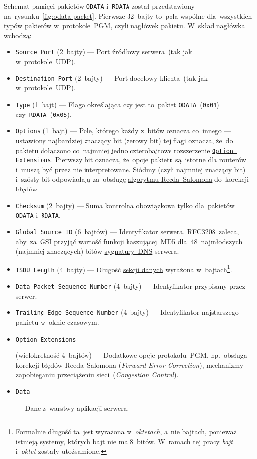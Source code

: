 \documentclass[thesis]{subfiles}
\begin{document}
Schemat pamięci pakietów \texttt{ODATA} i~\texttt{RDATA} został przedstawiony na~rysunku~\ref{fig:odata-packet}. Pierwsze 32~bajty to~pola wspólne dla~wszystkich typów pakietów w~protokole~PGM, czyli nagłówek pakietu. W~skład nagłówka wchodzą:
\begin{itemize}
	\item \texttt{Source~Port} (2~bajty) --- Port źródłowy serwera~(tak jak w~protokole~UDP).
	\item \texttt{Destination~Port} (2~bajty) --- Port docelowy klienta~(tak jak w~protokole~UDP).
	\item \texttt{Type} (1~bajt) --- Flaga określająca czy jest to~pakiet \texttt{ODATA}~(\texttt{0x04}) czy~\texttt{RDATA}~(\texttt{0x05}).
	\item \texttt{Options} (1~bajt) --- Pole, którego każdy z~bitów oznacza co~innego --- ustawiony najbardziej znaczący bit (zerowy bit) tej flagi oznacza, że~do pakietu dołączono co~najmniej jedno czterobajtowe rozszerzenie \hyperlink{itm:optext}{\texttt{Option Extensions}}. Pierwszy bit oznacza, że~\hyperlink{itm:optext}{opcje} pakietu są~istotne dla routerów i~muszą być przez nie interpretowane. Siódmy (czyli najmniej znaczący bit) i~szósty bit odpowiadają za~obsługę \href{https://en.wikipedia.org/wiki/Reed\%E2\%80\%93Solomon\_error\_correction}{algorytmu Reeda--Salomona} do~korekcji błędów.
	\item \texttt{Checksum} (2~bajty) --- Suma kontrolna obowiązkowa tylko dla~pakietów \texttt{ODATA} i~\texttt{RDATA}.
	\item \texttt{Global Source~ID} (6~bajtów) --- Identyfikator serwera. \href{https://tools.ietf.org/html/rfc3208\#page-33}{RFC3208~zaleca}, aby~za~GSI przyjąć wartość funkcji haszującej~\href{https://en.wikipedia.org/wiki/MD5}{MD5} dla~48~najmłodszych (najmniej znaczących) bitów \href{https://tools.ietf.org/html/rfc2535\#section-4}{sygnatury~DNS} serwera.
	\item \texttt{TSDU~Length} (4~bajty) --- Długość \hyperlink{itm:datasec}{sekcji danych} wyrażona w~bajtach\footnote{Formalnie długość ta~jest wyrażona w~\emph{oktetach}, a~nie bajtach, ponieważ istnieją systemy, których bajt nie ma 8~bitów. W~ramach tej pracy \emph{bajt} i~\emph{oktet} zostały utożsamione.}.
	\item \texttt{Data Packet Sequence Number} (4~bajty) --- Identyfikator przypisany przez serwer.
	\item \texttt{Trailing Edge Sequence Number} (4~bajty) --- Identyfikator najstarszego pakietu w~oknie czasowym.
	\item \hypertarget{itm:optext}{\texttt{Option Extensions}} (wielokrotność 4~bajtów) --- Dodatkowe opcje protokołu~PGM, np.~obsługa korekcji błędów Reeda--Salomona (\emph{Forward Error Correction}), mechanizmy zapobieganiu przeciążeniu sieci~(\emph{Congestion Control}).
	\item \hypertarget{itm:datasec}{\texttt{Data}} --- Dane z~warstwy aplikacji serwera.
\end{itemize}
\end{document}
